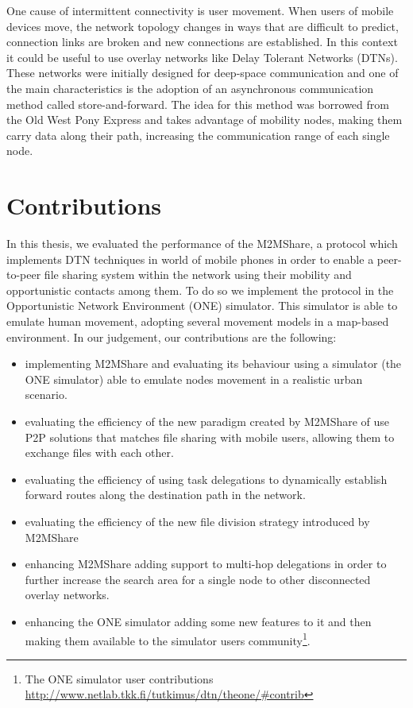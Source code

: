 One cause of intermittent connectivity is user movement. When users of mobile devices move, the network topology changes in ways that are difficult to predict, connection links are broken and new connections are established. In this context it could be useful to use overlay networks like Delay Tolerant Networks (DTNs). These networks were initially designed for deep-space communication and one of the main characteristics is the adoption of an asynchronous communication method called store-and-forward. The idea for this method was borrowed from the Old West Pony Express and takes advantage of mobility nodes, making them carry data along their path, increasing the communication range of each single node.


\section{Contributions}
In this thesis, we evaluated the performance of the M2MShare, a protocol which implements DTN techniques in world of mobile phones in order to enable a peer-to-peer file sharing system within the network using their mobility and opportunistic contacts among them. To do so we implement the protocol in the Opportunistic Network Environment (ONE) simulator. This simulator is able to emulate human movement, adopting several movement models in a map-based environment. In our judgement, our contributions are the following:
\begin{itemize}
\item implementing M2MShare and evaluating its behaviour using a simulator (the ONE simulator) able to emulate nodes movement in a realistic urban scenario.
\item evaluating the efficiency of the new paradigm created by M2MShare of use P2P solutions that matches file sharing with mobile users, allowing them to exchange files with each other.
\item evaluating the efficiency of using task delegations to dynamically establish forward routes along the destination path in the network.
\item evaluating the efficiency of the new file division strategy introduced by M2MShare 
\item enhancing M2MShare adding support to multi-hop delegations in order to further increase the search area for a single node to other disconnected overlay networks.
\item enhancing the ONE simulator adding some new features to it and then making them available to the simulator users community\footnote{The ONE simulator user contributions \href{http://www.netlab.tkk.fi/tutkimus/dtn/theone/\#contrib}{http://www.netlab.tkk.fi/tutkimus/dtn/theone/\#contrib}}.
\end{itemize}

